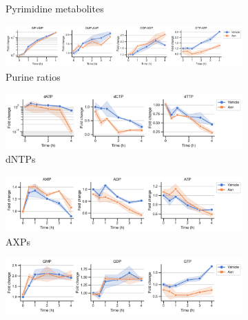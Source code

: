 \begin{figure}[!ht]
\begin{subfigure}[b]{0.68\textwidth}
        \caption{Pyrimidine metabolites}
        \label{fig:app_ch2:HT1080_Anti_pyr}
    \end{subfigure}
    \hfill
    \begin{subfigure}[b]{0.9\textwidth}
        \includegraphics[width=\textwidth]{figures/chap2/app/HT1080_Anti_pur.pdf}
        \caption{Purine ratios}
        \label{fig:app_ch2:HT1080_Anti_pur}
    \end{subfigure}
    \hfill
    \caption{}
\end{figure}

\begin{figure}[!ht]
    \ContinuedFloat
    \centering
    \begin{subfigure}[b]{0.68\textwidth}
        \includegraphics[width=\textwidth]{figures/chap2/app/HT1080_Anti_dntps.pdf}
        \caption{dNTPs}
        \label{fig:app_ch2:HT1080_Anti_dntps}
    \end{subfigure}
    \hfill
    \begin{subfigure}[b]{0.68\textwidth}
        \includegraphics[width=\textwidth]{figures/chap2/app/HT1080_Anti_axp.pdf}
        \caption{AXPs}
        \label{fig:app_ch2:HT1080_Anti_axp}
    \end{subfigure}
    \hfill
    \begin{subfigure}[b]{0.68\textwidth}
        \includegraphics[width=\textwidth]{figures/chap2/app/HT1080_Anti_gxp.pdf}

\end{subfigure}
\end{figure}
